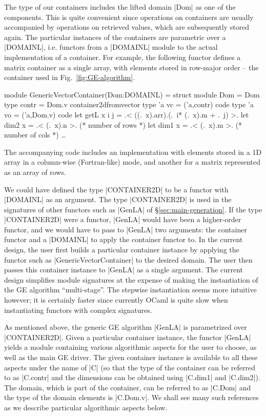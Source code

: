 \documentclass{elsart}
\begin{document}
The type of our containers includes the lifted domain |Dom| as one of
the components. This is quite convenient since operations on
containers are usually accompanied by operations on retrieved values,
which are subsequently stored again.
The particular instances of the containers are
parametric over a |DOMAINL|, i.e. functors from a |DOMAINL| module to
the actual implementation of a container.  For example, the following
functor defines a matrix container as a single array, with elements
stored in row-major order -- the container used in
Fig.~\ref{fig:GE-algorithm}.
\begin{code}
module GenericVectorContainer(Dom:DOMAINL) =
  struct
  module Dom = Dom
  type contr = Dom.v container2dfromvector
  type 'a vc = ('a,contr) code
  type 'a vo = ('a,Dom.v) code
  let getL x i j = .< ((.~x).arr).(.~i* (.~x).m + .~j) >.
  let dim2 x = .< (.~x).n >.      (* number of rows *)
  let dim1 x = .< (.~x).m >.      (* number of cols *)
  \dots
\end{code}
The accompanying code \cite{metamonadsURL} includes an implementation with
elements stored in a 1D array in a column-wise (Fortran-like)
mode, and another for a matrix represented as an array of rows.

We could have defined the type |CONTAINER2D| to be a functor with
|DOMAINL| as an argument. The type |CONTAINER2D| is used in the
signatures of other functors such as |GenLA| of
\S\ref{sec:main-generation}. If the type |CONTAINER2D| were a
functor, |GenLA| would have been a higher-order functor, and we would
have to pass to |GenLA| two arguments: the container functor and a
|DOMAINL| to apply the container functor to. In the current design,
the user first builds a particular container instance by applying the
functor such as |GenericVectorContainer| to the desired domain. The
user then passes this container instance to |GenLA| as a single
argument. The current design simplifies module signatures at
the expense of making the instantiation of the GE algorithm
``multi-stage''. The stepwise instantiation seems more intuitive
however; it is certainly faster since currently OCaml is quite slow
when instantiating functors with complex signatures.

As mentioned above, the generic GE algorithm |GenLA| is parametrized
over |CONTAINER2D|.  Given a particular container instance, the
functor |GenLA| yields a module containing various algorithmic aspects
for the user to choose, as well as the main GE driver. The given
container instance is available to all these aspects under the name of
|C| (so that the type of the container can be referred to as |C.contr|
and the dimensions can be obtained using |C.dim1| and |C.dim2|). The
domain, which is part of the container, can be referred to as
|C.Dom| and the type of the domain elements is |C.Dom.v|. We shall see
many such references as we describe particular algorithmic aspects
below.
\end{document}
